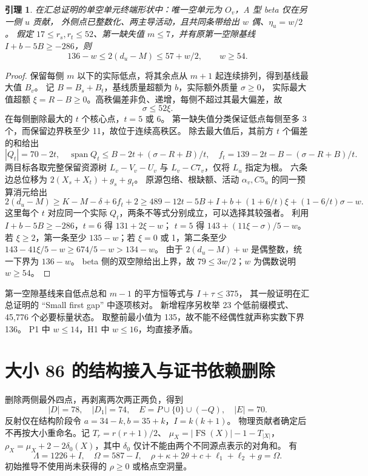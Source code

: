 \documentclass[11pt,a4paper]{article}
\newcommand{\FS}{\operatorname{FS}}
\newtheorem{lemma}[theorem]{引理}
\begin{document}
\begin{lemma}\label{lem:adaptive}
在汇总证明的单空单元终端形状中：唯一空单元为 $O_v$，A 型 beta 仅在另一侧 $u$ 贡献，
外侧点已整数化、两主导活动，且共同条带给出 $w$ 偶、$\eta_u=w/2$。
假定 $17\le r_s,r_t\le52$、第一缺失值 $m\le7$，并有原第一空隙基线
$I+b-5B\ge-286$，则
\[136-w\le2(d_u-M)\le57+w/2,\qquad w\ge54.\]
\end{lemma}
\begin{proof}
保留每侧 $m$ 以下的实际低点，将其余点从 $m+1$ 起连续排列，得到基线最大值 $B_v$。
记 $B=B_s+B_t$，基线质量超额为 $b$，实际额外质量 $\sigma\ge0$，
实际最大值超额 $\xi=R-B\ge0$。高秩偏差非负、递增，每侧不超过其最大偏差，故
\[\sigma\le52\xi.\]
在每侧删除最大的 $t$ 个核心点，$t=5$ 或 6。
第一缺失值分类保证低点每侧至多 3 个，而保留边界秩至少 11，故位于连续高秩区。
除去最大值后，其前方 $t$ 个偏差的和给出
\[
|Q_t|=70-2t,\quad
\operatorname{span}Q_t\le B-2t+(\sigma-R+B)/t,
\quad f_t=139-2t-B-(\sigma-R+B)/t.
\]
两目标各取完整保留资源树
$L_v-V_v-U_v$ 与 $L_v-C7_v$，仅将 $L_u$ 指定为根。
六条边总位移为 $2(X_s+X_t)+g_s+g_t$。
原源包络、根缺额、活动 $\alpha_v,C5_u$ 的同一预算消元给出
\[
2(d_u-M)\ge K-M-\delta+6f_t+2
\ge489-12t-5B+I+b+(1+6/t)\xi+(1-6/t)\sigma-w.
\]
这里每个 $t$ 对应同一个实际 $Q_t$，两条不等式分别成立，可以选择其较强者。
利用 $I+b-5B\ge-286$，$t=6$ 得 $131+2\xi-w$；
$t=5$ 得 $143+(11\xi-\sigma)/5-w$。
若 $\xi\ge2$，第一条至少 $135-w$；若 $\xi=0$ 或 1，第二条至少
$143-41\xi/5-w\ge674/5-w>134-w$。
由于 $2(d_u-M)+w$ 是偶整数，统一下界为 $136-w$。
beta 侧的双空隙给出上界，故 $79\le3w/2$；$w$ 为偶数说明 $w\ge54$。
\end{proof}
第一空隙基线来自低点总和 $m-1$ 的平方恒等式与 $I+\tau\le375$，
其一般证明在汇总证明的 ``Small first gap'' 中逐项核对。
新增程序另枚举 23 个低前缀模式、45,776 个必要标量状态。
取整前最小值为 135，故不能不经偶性就声称实数下界 136。
P1 中 $w\le14$，H1 中 $w\le16$，均直接矛盾。

\section{大小 86 的结构接入与证书依赖删除}\label{struct}
删除两侧最外四点，再剥离两次两正两负，得到
\[
|D|=78,\quad |D_1|=74,\quad E=P\cup\{0\}\cup(-Q),\quad |E|=70.
\]
反射仅在结构阶段令 $a=34-k,b=35+k$，$I=k(k+1)$。
物理贡献者确定后不再按大小重命名。记 $T_r=r(r+1)/2$、
$\mu_X=|\FS(X)|-1-T_{|X|}$，
$\rho_X=\mu_X+2-2\delta_0(X)$，其中 $\delta_0$ 仅计不能由两个不同源点表示的对角和。
有
\[
\Lambda=1226+I,\quad\Omega=587-I,\quad
\rho+\kappa+2\theta+c+\ell_1+\ell_2+g=\Omega.\tag{S}
\]
初始推导不使用尚未获得的 $\rho\ge0$ 或格点空洞量。
\end{document}
